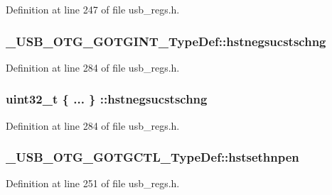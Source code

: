 Definition at line 247 of file usb\-\_\-regs.\-h.

\hypertarget{group___u_s_b___o_t_g___d_r_i_v_e_r_ga4910cdca8d45c257197d1eafda55ddbb}{
\subsubsection[{hstnegsucstschng}]{ \-\_\-\-U\-S\-B\-\_\-\-O\-T\-G\-\_\-\-G\-O\-T\-G\-I\-N\-T\-\_\-\-Type\-Def\-::hstnegsucstschng}}\label{group___u_s_b___o_t_g___d_r_i_v_e_r_ga4910cdca8d45c257197d1eafda55ddbb}


Definition at line 284 of file usb\-\_\-regs.\-h.

\hypertarget{group___u_s_b___o_t_g___d_r_i_v_e_r_gad883a9f445a5b63a8f83cfe87cf2d9bd}{
\subsubsection[{hstnegsucstschng}]{\setlength{\rightskip}{0pt plus 5cm}uint32\-\_\-t \{ ... \} \-::hstnegsucstschng}}\label{group___u_s_b___o_t_g___d_r_i_v_e_r_gad883a9f445a5b63a8f83cfe87cf2d9bd}


Definition at line 284 of file usb\-\_\-regs.\-h.

\hypertarget{group___u_s_b___o_t_g___d_r_i_v_e_r_gaf0bba72b67cdc4421da620a2206119bb}{
\subsubsection[{hstsethnpen}]{ \-\_\-\-U\-S\-B\-\_\-\-O\-T\-G\-\_\-\-G\-O\-T\-G\-C\-T\-L\-\_\-\-Type\-Def\-::hstsethnpen}}\label{group___u_s_b___o_t_g___d_r_i_v_e_r_gaf0bba72b67cdc4421da620a2206119bb}


Definition at line 251 of file usb\-\_\-regs.\-h.

